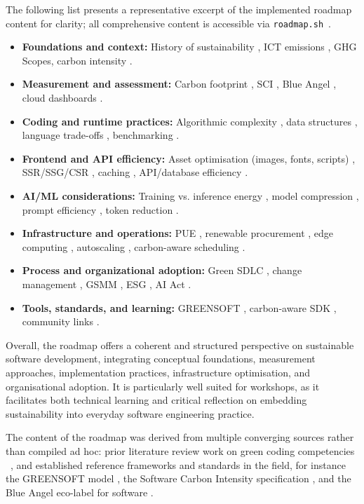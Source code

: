 \documentclass[english]{lni}
\begin{document}
The following list presents a representative excerpt of the implemented roadmap content for clarity; all comprehensive content is accessible via \texttt{roadmap.sh}~\cite{roadmaprelease}.
\begin{itemize}
    \item \textbf{Foundations and context:} History of sustainability \citep{Me72}, ICT emissions \citep{Fr21}, GHG Scopes\citep{NR04}, carbon intensity \citep{GC24}.
    \item \textbf{Measurement and assessment:} Carbon footprint \citep{NR04}, SCI \citep{SC24}, Blue Angel \citep{NA21}, cloud dashboards \citep{AW26}.
    \item \textbf{Coding and runtime practices:} Algorithmic complexity \citep{Ca24}, data structures \citep{Ha18}, language trade-offs \citep{Va25}, benchmarking \citep{Pe21}.
    \item \textbf{Frontend and API efficiency:} Asset optimisation (images, fonts, scripts) \citep{MD26}, SSR/SSG/CSR \citep{OJ19}, caching \citep{Ka21}, API/database efficiency \citep{Mi26}.
    \item \textbf{AI/ML considerations:} Training vs. inference energy \citep{St19}, model compression \citep{Pi24}, prompt efficiency \cite{PG26}, token reduction \citep{Ar24}.
    \item \textbf{Infrastructure and operations:} PUE \citep{He21}, renewable procurement \citep{RE26}, edge computing \citep{KR23}, autoscaling \citep{Ve25}, carbon-aware scheduling \citep{GT24}.
    \item \textbf{Process and organizational adoption:} Green SDLC \citep{Na10}, change management \citep{AN22}, GSMM \citep{GM25}, ESG \citep{Ga26}, AI Act \citep{EA24}.
    \item \textbf{Tools, standards, and learning:} GREENSOFT \citep{NA11}, carbon-aware SDK \citep{CA26}, community links \citep{La25}.
\end{itemize}

Overall, the roadmap offers a coherent and structured perspective on sustainable software development, integrating conceptual foundations, measurement approaches, implementation practices, infrastructure optimisation, and organisational adoption. It is particularly well suited for workshops, as it facilitates both technical learning and critical reflection on embedding sustainability into everyday software engineering practice.

The content of the roadmap was derived from multiple converging sources rather than compiled ad hoc: prior literature review work on green coding competencies ~\cite{junger23_litrep}, and established reference frameworks and standards in the field, for instance the GREENSOFT model \citep{NA11}, the Software Carbon Intensity specification \citep{SC24}, and the Blue Angel eco-label for software \citep{NA21}.
\end{document}
